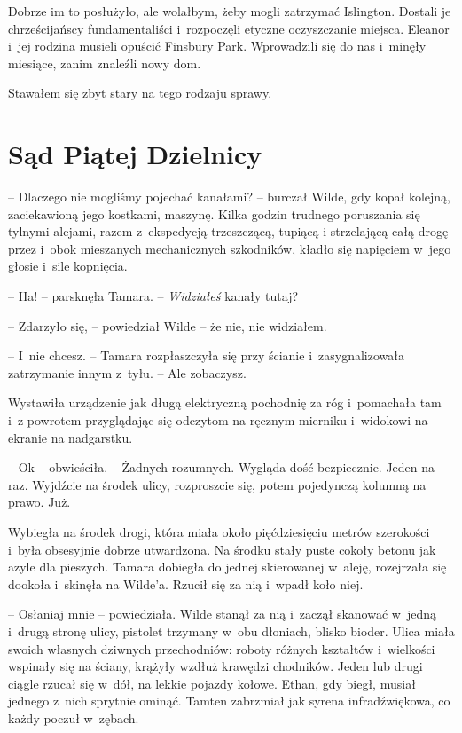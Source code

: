 \documentclass[oneside,polish,11pt,sfheadings]{mwbk}
\begin{document}
Dobrze im to posłużyło, ale wolałbym, żeby mogli zatrzymać Islington.
Dostali je chrześcijańscy fundamentaliści i~rozpoczęli etyczne
oczyszczanie miejsca. Eleanor i~jej rodzina musieli opuścić Finsbury
Park. Wprowadzili się do nas i~minęły miesiące, zanim znaleźli nowy dom.

Stawałem się zbyt stary na tego rodzaju sprawy.

\chapter{Sąd Piątej Dzielnicy}


-- Dlaczego nie mogliśmy pojechać kanałami? -- burczał Wilde, gdy kopał
kolejną, zaciekawioną jego kostkami, maszynę. Kilka godzin trudnego
poruszania się tylnymi alejami, razem z~ekspedycją trzeszczącą, tupiącą
i strzelającą całą drogę przez i~obok mieszanych mechanicznych
szkodników, kładło się napięciem w~jego głosie i~sile kopnięcia.

-- Ha! -- parsknęła Tamara. -- \emph{Widziałeś} kanały tutaj?

-- Zdarzyło się, -- powiedział Wilde -- że nie, nie widziałem.

-- I~nie chcesz. -- Tamara rozpłaszczyła się przy ścianie i~zasygnalizowała zatrzymanie innym z~tyłu. -- Ale zobaczysz.

Wystawiła urządzenie jak długą elektryczną pochodnię za róg i~pomachała
tam i~z powrotem przyglądając się odczytom na ręcznym mierniku i~widokowi na ekranie na nadgarstku.

-- Ok -- obwieściła. -- Żadnych rozumnych. Wygląda dość bezpiecznie. Jeden
na raz. Wyjdźcie na środek ulicy, rozproszcie się, potem pojedynczą
kolumną na prawo. Już.

Wybiegła na środek drogi, która miała około pięćdziesięciu metrów
szerokości i~była obsesyjnie dobrze utwardzona. Na środku stały puste
cokoły betonu jak azyle dla pieszych. Tamara dobiegła do jednej
skierowanej w~aleję, rozejrzała się dookoła i~skinęła na Wilde'a. Rzucił
się za nią i~wpadł koło niej.

-- Osłaniaj mnie -- powiedziała. Wilde stanął za nią i~zaczął skanować w~jedną i~drugą stronę ulicy, pistolet trzymany w~obu dłoniach, blisko
bioder. Ulica miała swoich własnych dziwnych przechodniów: roboty
różnych kształtów i~wielkości wspinały się na ściany, krążyły wzdłuż
krawędzi chodników. Jeden lub drugi ciągle rzucał się w~dół, na lekkie
pojazdy kołowe. Ethan, gdy biegł, musiał jednego z~nich sprytnie ominąć.
Tamten zabrzmiał jak syrena infradźwiękowa, co każdy poczuł w~zębach.
\end{document}

